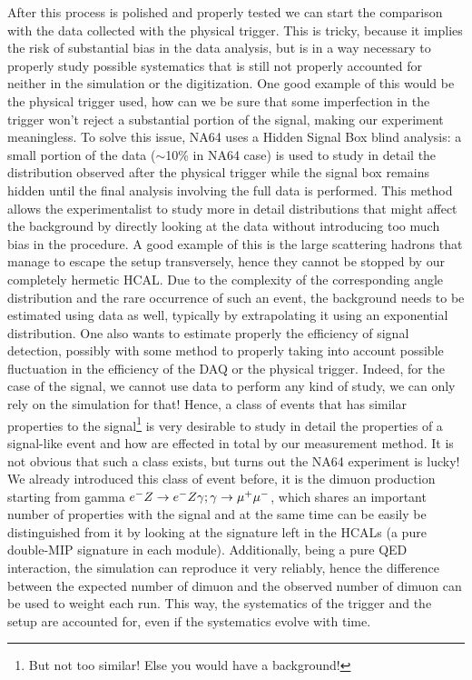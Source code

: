 After this process is polished and properly tested we can start the comparison with the data collected with the physical trigger. This is tricky, because it implies the risk of substantial bias in the data analysis, but is in a way necessary to properly study possible systematics that is still not properly accounted for neither in the simulation or the digitization. One good example of this would be the physical trigger used, how can we be sure that some imperfection in the trigger won't reject a substantial portion of the signal, making our experiment meaningless. To solve this issue, NA64 uses a Hidden Signal Box blind analysis\cite{blind-analysis}: a small portion of the data ($\sim$10\% in NA64 case) is used to study in detail the distribution observed after the physical trigger while the signal box remains hidden until the final analysis involving the full data is performed. This method allows the experimentalist to study more in detail distributions that might affect the background by directly looking at the data without introducing too much bias in the procedure. A good example of this is the large scattering hadrons that manage to escape the setup transversely, hence they cannot be stopped by our completely hermetic HCAL. Due to the complexity of the corresponding angle distribution and the rare occurrence of such an event, the background needs to be estimated using data as well, typically by extrapolating it using an exponential distribution. One also wants to estimate properly the efficiency of signal detection, possibly with some method to properly taking into account possible fluctuation in the efficiency of the DAQ or the physical trigger. Indeed, for the case of the signal, we cannot use data to perform any kind of study, we can only rely on the simulation for that! Hence, a class of events that has similar properties to the signal\footnote{But not too similar! Else you would have a background!} is very desirable to study in detail the properties of a signal-like event and how are effected in total by our measurement method. It is not obvious that such a class exists, but turns out the NA64 experiment is lucky! We already introduced this class of event before, it is the dimuon production starting from gamma $e^- Z \to e^- Z \gamma; \gamma \to \mu^+ \mu^-$, which shares an important number of properties with the signal and at the same time can be easily be distinguished from it by looking at the signature left in the HCALs (a pure double-MIP signature in each module). Additionally, being a pure QED interaction, the simulation can reproduce it very reliably, hence the difference between the expected number of dimuon and the observed number of dimuon can be used to weight each run. This way, the systematics of the trigger and the setup are accounted for, even if the systematics evolve with time.

